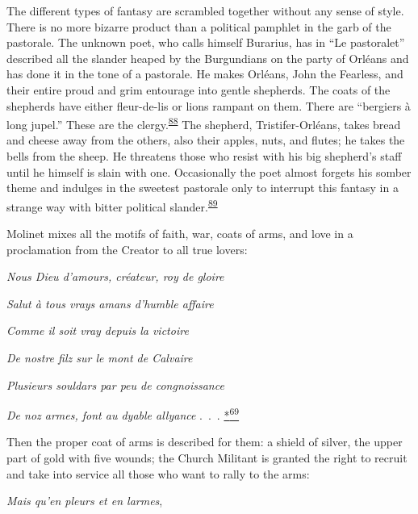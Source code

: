 The different types of fantasy are scrambled together without any sense
of style. There is no more bizarre product than a political pamphlet in
the garb of the pastorale. The unknown poet, who calls himself Burarius,
has in ``Le pastoralet'' described all the slander heaped by the
Burgundians on the party of Orléans and has done it in the tone of a
pastorale. He makes Orléans, John the Fearless, and their entire proud
and grim entourage into gentle shepherds. The coats of the shepherds
have either fleur-de-lis or lions rampant on them. There are ``bergiers
à long jupel.'' These are the
clergy.\textsuperscript{\protect\hypertarget{21_Chapter_Thirteen__IMAGE_AND_WORD.xhtmlux5cux23id_136}{\protect\hyperlink{23_NOTES.xhtmlux5cux23id_137}{88}}}
The shepherd, Tristifer-Orléans, takes bread and cheese away from the
others, also their apples, nuts, and flutes; he takes the bells from the
sheep. He threatens those who resist with his big shepherd's staff until
he himself is slain with one. Occasionally the poet almost forgets his
somber theme and indulges in the sweetest pastorale only to interrupt
this fantasy in a strange way with bitter political
slander.\textsuperscript{\protect\hypertarget{21_Chapter_Thirteen__IMAGE_AND_WORD.xhtmlux5cux23id_134}{\protect\hyperlink{23_NOTES.xhtmlux5cux23id_135}{89}}}

Molinet mixes all the motifs of faith, war, coats of arms, and love in a
proclamation from the Creator to all true lovers:

\emph{\protect\hypertarget{21_Chapter_Thirteen__IMAGE_AND_WORD.xhtmlux5cux23page_380}{}{}Nous
Dieu d'amours, créateur, roy de gloire}

\emph{Salut à tous vrays amans d'humble affaire}

\emph{Comme il soit vray depuis la victoire}

\emph{De nostre filz sur le mont de Calvaire}

\emph{Plusieurs souldars par peu de congnoissance}

\emph{De noz armes, font au dyable allyance} .~.~.
\protect\hypertarget{21_Chapter_Thirteen__IMAGE_AND_WORD.xhtmlux5cux23id_2815}{\protect\hyperlink{23_NOTES.xhtmlux5cux23id_2816}{*\textsuperscript{69}}}

Then the proper coat of arms is described for them: a shield of silver,
the upper part of gold with five wounds; the Church Militant is granted
the right to recruit and take into service all those who want to rally
to the arms:

\emph{Mais qu'en pleurs et en larmes},

